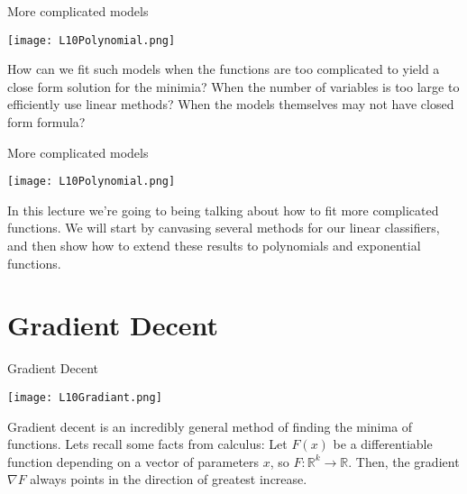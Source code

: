 \documentclass[10pt, table, dvipsnames,xcdraw, handout]{beamer}
\newcommand{\bR}{\ensuremath{\mathbb{R}}}
\begin{document}
\begin{frame}[fragile]{More complicated models}
  \begin{minipage}[t][0.5\textheight][t]{\textwidth}
	\centering \texttt{[image: L10Polynomial.png]} 
  \end{minipage}
  \vfill
\begin{minipage}[t][0.5\textheight][t]{\textwidth}
How can we fit such models when the functions are too complicated to yield a close form solution for the minimia? \pause When the number of variables is too large to efficiently use linear methods? \pause When the models themselves may not have closed form formula?\pause
\end{minipage}
\end{frame}


\begin{frame}[fragile]{More complicated models}
  \begin{minipage}[t][0.5\textheight][t]{\textwidth}
	\centering \texttt{[image: L10Polynomial.png]} 
  \end{minipage}
  \vfill
\begin{minipage}[t][0.5\textheight][t]{\textwidth}
In this lecture we're going to being talking about how to fit more complicated functions. We will start by canvasing several methods for our linear classifiers, and then show how to extend these results to polynomials and exponential functions. 
\end{minipage}
\end{frame}





\section{Gradient Decent}

\begin{frame}[fragile]{Gradient Decent}
  \begin{minipage}[t][0.5\textheight][t]{\textwidth}
	\centering \texttt{[image: L10Gradiant.png]} 
  \end{minipage}
  \vfill
\begin{minipage}[t][0.5\textheight][t]{\textwidth}
Gradient decent is an incredibly general method of finding the minima of functions. Lets recall some facts from calculus: Let $F(x)$ be a differentiable function depending on a vector of parameters $x$, so $F:\bR^k\to \bR$. Then, the gradient $\nabla F$ always points in the direction of greatest increase.
\end{minipage}
\end{frame}
\end{document}
